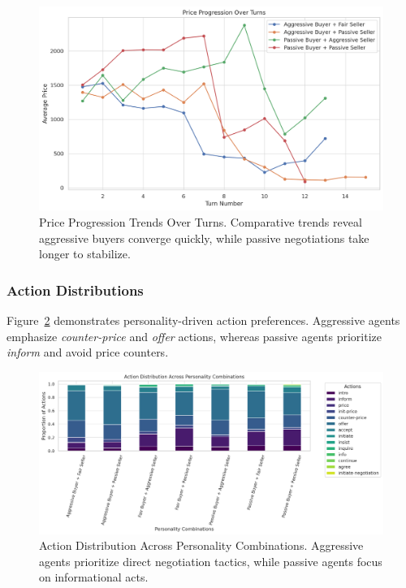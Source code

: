 \documentclass[11pt]{article}
\begin{document}
\begin{figure}[h]
    \centering
    \includegraphics[width=1\linewidth]{figures/personality/price_progression_over_turns.png}
    \caption{Price Progression Trends Over Turns. Comparative trends reveal aggressive buyers converge quickly, while passive negotiations take longer to stabilize.}
    \label{fig:price_progression_over_turns}
\end{figure}

\subsubsection{Action Distributions}
Figure~\ref{fig:action_distributions} demonstrates personality-driven action preferences. Aggressive agents emphasize \textit{counter-price} and \textit{offer} actions, whereas passive agents prioritize \textit{inform} and avoid price counters.

\begin{figure}[h]
    \centering
    \includegraphics[width=1\linewidth]{figures/personality/action_distribution.png}
    \caption{Action Distribution Across Personality Combinations. Aggressive agents prioritize direct negotiation tactics, while passive agents focus on informational acts.}
    \label{fig:action_distributions}
\end{figure}
\end{document}
